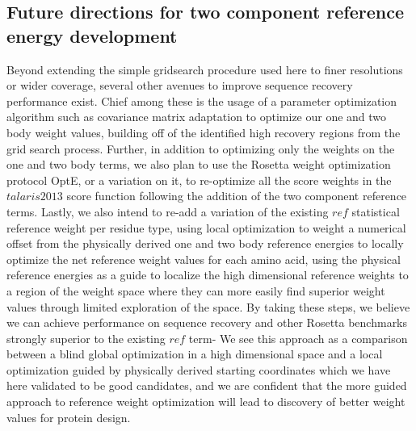 \subsection{Future directions for two component reference energy development}
Beyond extending the simple gridsearch procedure used here to finer resolutions or wider coverage, several other avenues to improve sequence recovery performance exist.
Chief among these is the usage of a parameter optimization algorithm such as covariance matrix adaptation\cite{ostermeier_step-size_1994} to optimize our one and two body weight values, building off of the identified high recovery regions from the grid search process.
Further, in addition to optimizing only the weights on the one and two body terms, we also plan to use the Rosetta weight optimization protocol OptE\cite{leaver-fay_chapter_2013}, or a variation on it, to re-optimize all the score weights in the $talaris2013$ score function following the addition of the two component reference terms.
Lastly, we also intend to re-add a variation of the existing $ref$ statistical reference weight per residue type, using local optimization to weight a numerical offset from the physically derived one and two body reference energies to locally optimize the net reference weight values for each amino acid, using the physical reference energies as a guide to localize the high dimensional reference weights to a region of the weight space where they can more easily find superior weight values through limited exploration of the space.
By taking these steps, we believe we can achieve performance on sequence recovery and other Rosetta benchmarks strongly superior to the existing $ref$ term-
We see this approach as a comparison between a blind global optimization in a high dimensional space and a local optimization guided by physically derived starting coordinates which we have here validated to be good candidates, and we are confident that the more guided approach to reference weight optimization will lead to discovery of better weight values for protein design.
